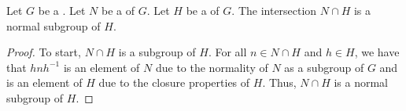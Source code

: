 \begin{proposition} \label{proposition:intersection_of_normal_subgroup_and_subgroup_is_normal_subgroup_of_subgroup}
    Let $G$ be a . Let $N$ be a  of $G$. Let $H$ be a  of $G$. 
    The intersection $N \cap H$ is a normal subgroup of $H$.
\end{proposition}
\begin{proof}
    To start, $N \cap H$ is a subgroup of $H$. For all $n \in N \cap H$ and $h \in H$, we have that $h n h^{-1}$ is an element of $N$ due to the normality of $N$ as a subgroup of $G$ and is an element of $H$ due to the closure properties of $H$. Thus, $N \cap H$ is a normal subgroup of $H$.
\end{proof}